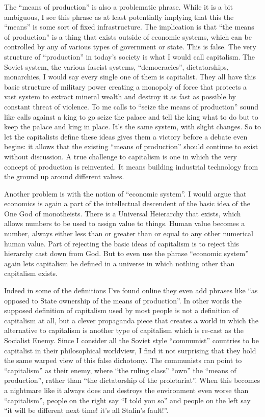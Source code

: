 The ``means of production'' is also a problematic phrase. While it is a
bit ambiguous, I see this phrase as at least potentially implying that
this the ``means'' is some sort of fixed infrastructure. The implication
is that ``the means of production'' is a thing that exists outside of
economic systems, which can be controlled by any of various types of
government or state. This is false. The very structure of ``production''
in today's society is what I would call capitalism. The Soviet system,
the various fascist systems, ``democracies'', dictatorships, monarchies,
I would say every single one of them is capitalist. They all have this
basic structure of military power creating a monopoly of force that
protects a vast system to extract mineral wealth and destroy it as fast
as possible by constant threat of violence. To me calls to ``seize the
means of production'' sound like calls against a king to go seize the
palace and tell the king what to do but to keep the palace and king in
place. It's the same system, with slight changes. So to let the
capitalists define these ideas gives them a victory before a debate even
begins: it allows that the existing ``means of production'' should
continue to exist without discussion. A true challenge to capitalism is
one in which the very concept of production is reinvented. It means
building industrial technology from the ground up around different
values.

Another problem is with the notion of ``economic system''. I would argue
that economics is again a part of the intellectual descendent of the
basic idea of the One God of monotheists. There is a Universal
Heierarchy that exists, which allows numbers to be used to assign value
to things. Human value becomes a number, always either less than or
greater than or equal to any other numerical human value. Part of
rejecting the basic ideas of capitalism is to reject this hierarchy cast
down from God. But to even use the phrase ``economic system'' again lets
capitalism be defined in a universe in which nothing other than
capitalism exists.

Indeed in some of the definitions I've found online they even add
phrases like ``as opposed to State ownership of the means of
production''. In other words the supposed definition of capitalism used
by most people is not a definition of capitalism at all, but a clever
propaganda piece that creates a world in which the alternative to
capitalism is another type of capitalism which is re-cast as the
Socialist Enemy. Since I consider all the Soviet style ``communist''
countries to be capitalist in their philosophical worldview, I find it
not surprising that they hold the same warped view of this false
dichotomy. The communists can point to ``capitalism'' as their enemy,
where ``the ruling class'' ``own'' the ``means of production'', rather
than ``the dictatorship of the proletariat''. When this becomes a
nightmare like it always does and destroys the environment even worse
than ``capitalism'', people on the right say ``I told you so'' and
people on the left say ``it will be different next time! it's all
Stalin's fault!''.

